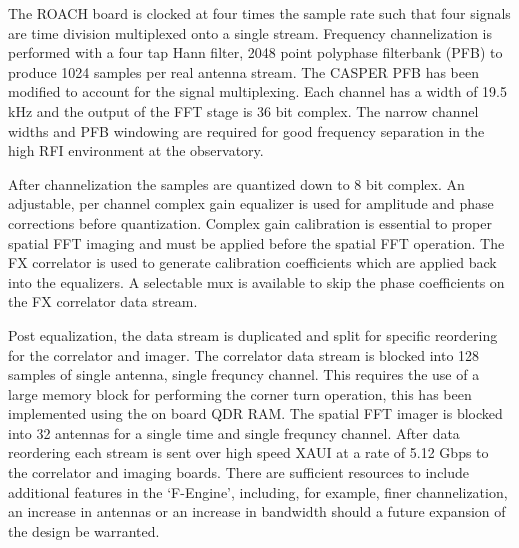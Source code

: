 \documentclass[useAMS,macros,usenatbib]{mn2e}
\begin{document}
The ROACH board is clocked at four times the sample rate such that four signals are time division multiplexed onto a single stream.
Frequency channelization is performed with a four tap Hann filter, 2048 point polyphase filterbank (PFB) to produce 1024 samples per real antenna stream.
The CASPER PFB has been modified to account for the signal multiplexing.
Each channel has a width of 19.5 kHz and the output of the FFT stage is 36 bit complex.
The narrow channel widths and PFB windowing are required for good frequency separation in the high RFI environment at the observatory.

After channelization the samples are quantized down to 8 bit complex.
An adjustable, per channel complex gain equalizer is used for amplitude and phase corrections before quantization.
Complex gain calibration is essential to proper spatial FFT imaging and must be applied before the spatial FFT operation.
The FX correlator is used to generate calibration coefficients which are applied back into the equalizers.
A selectable mux is available to skip the phase coefficients on the FX correlator data stream.

Post equalization, the data stream is duplicated and split for specific reordering for the correlator and imager.
The correlator data stream is blocked into 128 samples of single antenna, single frequncy channel.
This requires the use of a large memory block for performing the corner turn operation, this has been implemented using the on board QDR RAM.
The spatial FFT imager is blocked into 32 antennas for a single time and single frequncy channel. 
After data reordering each stream is sent over high speed XAUI at a rate of 5.12 Gbps to the correlator and imaging boards.
There are sufficient resources to include additional features in the `F-Engine', including, for example, finer channelization, an increase in antennas or an increase in bandwidth should a future expansion of the design be warranted.

\end{document}
